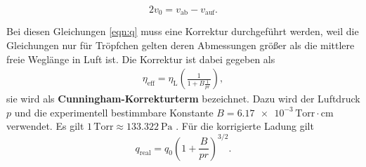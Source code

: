 \begin{equation}
    \label{eqn:v_0}
    2v_0 = v_\text{ab} - v_\text{auf}.
\end{equation}

Bei diesen Gleichungen \ref{eqn:q} muss eine Korrektur durchgeführt werden, weil die Gleichungen nur für Tröpfchen gelten deren Abmessungen größer 
als die mittlere freie Weglänge in Luft ist.
Die Korrektur ist dabei gegeben als
\begin{align}
\label{eq:Theorie_Cunningham_Viskositaet}
\eta_\text{eff}=\eta_\text{L}\left( \frac{1}{1+B\frac{1}{pr}} \right),
\end{align}
sie wird als \textbf{Cunningham-Korrekturterm} bezeichnet. 
Dazu wird der Luftdruck $p$ und die experimentell bestimmbare Konstante $B =  \num{6.17e-3}\, \text{Torr}\cdot\unit{\centi\metre}$ \cite{1} verwendet.
Es gilt $1\,\text{Torr} \approx \qty{133.322}{\pascal}$ \cite{2}.
Für die korrigierte Ladung gilt
\begin{equation}
    \label{eqn:q_korrigiert}
    q_\text{real} = q_0 \left(1+ \frac{B}{pr}\right)^{3/2}.
\end{equation}